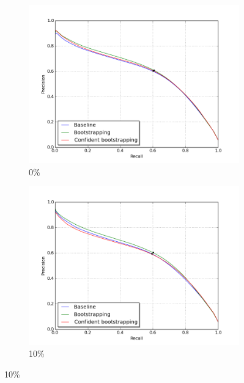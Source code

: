 \begin{figure}[H]
\begin{subfigure}{0.31\textwidth}
\includegraphics[width=\textwidth]{figs/E2/pr_0.png}
\caption{ 0\% } \label{fig:app_E2_0_pr}
\vspace{0.1cm} %
\end{subfigure}
\hspace*{\fill} %
\begin{subfigure}{0.31\textwidth}
\includegraphics[width=\textwidth]{figs/E2/pr_1.png}
\caption{10\% } \label{fig:app_E2_1_pr}
\vspace{0.1cm} %

\end{subfigure}
\end{figure}
